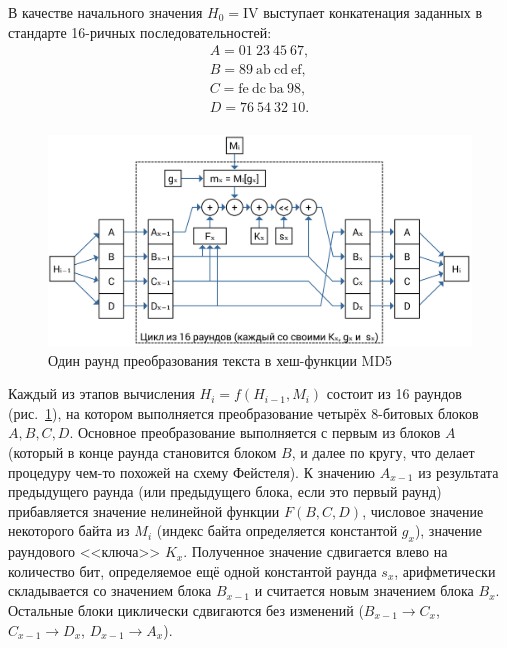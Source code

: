 В качестве начального значения $H_0 = \text{IV}$ выступает конкатенация заданных в стандарте 16-ричных последовательностей:
\[\begin{array}{l}
A = \text{01} ~ \text{23} ~ \text{45} ~ \text{67},\\
B = \text{89} ~ \text{ab} ~ \text{cd} ~ \text{ef},\\
C = \text{fe} ~ \text{dc} ~ \text{ba} ~ \text{98},\\
D = \text{76} ~ \text{54} ~ \text{32} ~ \text{10}.\\
\end{array}\]

\begin{figure}[htb]
    \centering
    \includegraphics[width=\textwidth]{pic/md5-round}
    \caption{Один раунд преобразования текста в хеш-функции MD5}
    \label{fig:md5-round}
\end{figure}

Каждый из этапов вычисления $H_i = f ( H_{i-1}, M_i )$ состоит из 16 раундов (рис.~\ref{fig:md5-round}), на котором выполняется преобразование четырёх 8-битовых блоков $A, B, C, D$. Основное преобразование выполняется с первым из блоков $A$ (который в конце раунда становится блоком $B$, и далее по кругу, что делает процедуру чем-то похожей на схему Фейстеля). К значению $A_{x-1}$ из результата предыдущего раунда (или предыдущего блока, если это первый раунд) прибавляется значение нелинейной функции $F(B, C, D)$, числовое значение некоторого байта из $M_i$ (индекс байта определяется константой $g_x$), значение раундового <<ключа>> $K_x$. Полученное значение сдвигается влево на количество бит, определяемое ещё одной константой раунда $s_x$, арифметически складывается со значением блока $B_{x-1}$ и считается новым значением блока $B_x$. Остальные блоки циклически сдвигаются без изменений ($B_{x-1} \to C_x$, $C_{x-1} \to D_x$, $D_{x-1} \to A_x$).

